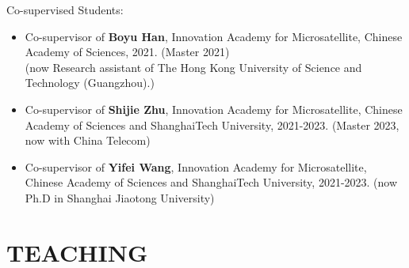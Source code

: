 \documentclass[paper=a4,fontsize=11pt]{scrartcl} %
\newcommand{\NewPart}[1]{\section*{\uppercase{#1}}}
\begin{document}
Co-supervised Students:
\begin{itemize}
	\item Co-supervisor of \textbf{Boyu Han}, Innovation Academy for Microsatellite, Chinese Academy
	of Sciences, 2021. (Master 2021)\\
		(now Research assistant of The Hong Kong University of Science and Technology (Guangzhou).)
	
	
	\item Co-supervisor of \textbf{Shijie Zhu}, Innovation Academy for Microsatellite, Chinese Academy
	of Sciences and ShanghaiTech University, 2021-2023. (Master 2023, now with China
	Telecom)
	
	
	\item Co-supervisor of \textbf{Yifei Wang}, Innovation Academy for Microsatellite, Chinese
	Academy of Sciences and ShanghaiTech University, 2021-2023. (now Ph.D in Shanghai Jiaotong University)
	
	
\end{itemize}

\NewPart{Teaching}
\end{document}
